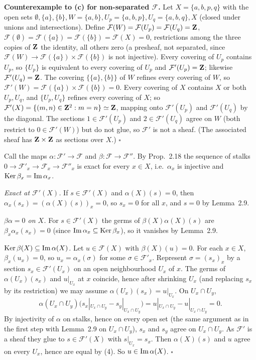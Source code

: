 \documentclass[11pt]{article}
\begin{document}
\textbf{Counterexample to (c) for non-separated $\mathcal F$.} Let $X=\{a,b,p,q\}$ with the open sets $\emptyset,\{a\},\{b\},W=\{a,b\},U_p=\{a,b,p\},U_q=\{a,b,q\},X$ (closed under unions and intersections). Define $\mathcal F(W)=\mathcal F(U_p)=\mathcal F(U_q)=\mathbf Z$, $\mathcal F(\emptyset)=\mathcal F(\{a\})=\mathcal F(\{b\})=\mathcal F(X)=0$, restrictions among the three copies of $\mathbf Z$ the identity, all others zero (a presheaf, not separated, since $\mathcal F(W)\to\mathcal F(\{a\})\times\mathcal F(\{b\})$ is not injective). Every covering of $U_p$ contains $U_p$, so $\{U_p\}$ is equivalent to every covering of $U_p$ and $\mathcal F'(U_p)=\mathbf Z$; likewise $\mathcal F'(U_q)=\mathbf Z$. The covering $\{\{a\},\{b\}\}$ of $W$ refines every covering of $W$, so $\mathcal F'(W)=\mathcal F(\{a\})\times\mathcal F(\{b\})=0$. Every covering of $X$ contains $X$ or both $U_p,U_q$, and $\{U_p,U_q\}$ refines every covering of $X$; so $\mathcal F'(X)=\{(m,n)\in\mathbf Z^2: m=n\}\simeq\mathbf Z$, mapping onto $\mathcal F'(U_p)$ and $\mathcal F'(U_q)$ by the diagonal. The sections $1\in\mathcal F'(U_p)$ and $2\in\mathcal F'(U_q)$ agree on $W$ (both restrict to $0\in\mathcal F'(W)$) but do not glue, so $\mathcal F'$ is not a sheaf. (The associated sheaf has $\mathbf Z\times\mathbf Z$ as sections over $X$.) \hfill$\square$

\pf
Call the maps $\alpha:\mathcal F'\to\mathcal F$ and $\beta:\mathcal F\to\mathcal F''$. By Prop.~2.18 the sequence of stalks $0\to\mathcal F'_x\to\mathcal F_x\to\mathcal F''_x$ is exact for every $x\in X$, i.e.\ $\alpha_x$ is injective and $\operatorname{Ker}\beta_x=\operatorname{Im}\alpha_x$.

\emph{Exact at $\mathcal F'(X)$.} If $s\in\mathcal F'(X)$ and $\alpha(X)(s)=0$, then $\alpha_x(s_x)=(\alpha(X)(s))_x=0$, so $s_x=0$ for all $x$, and $s=0$ by Lemma~2.9.

\emph{$\beta\alpha=0$ on $X$.} For $s\in\mathcal F'(X)$ the germs of $\beta(X)\alpha(X)(s)$ are $\beta_x\alpha_x(s_x)=0$ (since $\operatorname{Im}\alpha_x\subseteq\operatorname{Ker}\beta_x$), so it vanishes by Lemma~2.9.

\emph{$\operatorname{Ker}\beta(X)\subseteq\operatorname{Im}\alpha(X)$.} Let $u\in\mathcal F(X)$ with $\beta(X)(u)=0$. For each $x\in X$, $\beta_x(u_x)=0$, so $u_x=\alpha_x(\sigma)$ for some $\sigma\in\mathcal F'_x$. Represent $\sigma=(s_x)_x$ by a section $s_x\in\mathcal F'(U_x)$ on an open neighbourhood $U_x$ of $x$. The germs of $\alpha(U_x)(s_x)$ and $u|_{U_x}$ at $x$ coincide, hence after shrinking $U_x$ (and replacing $s_x$ by its restriction) we may assume $\alpha(U_x)(s_x)=u|_{U_x}$. On $U_x\cap U_y$,
\[ \alpha(U_x\cap U_y)\bigl(s_x|_{U_x\cap U_y}-s_y|_{U_x\cap U_y}\bigr)=u|_{U_x\cap U_y}-u|_{U_x\cap U_y}=0. \]
By injectivity of $\alpha$ on stalks, hence on every open set (the same argument as in the first step with Lemma~2.9 on $U_x\cap U_y$), $s_x$ and $s_y$ agree on $U_x\cap U_y$. As $\mathcal F'$ is a sheaf they glue to $s\in\mathcal F'(X)$ with $s|_{U_x}=s_x$. Then $\alpha(X)(s)$ and $u$ agree on every $U_x$, hence are equal by (4). So $u\in\operatorname{Im}\alpha(X)$. \hfill$\square$
\end{document}
